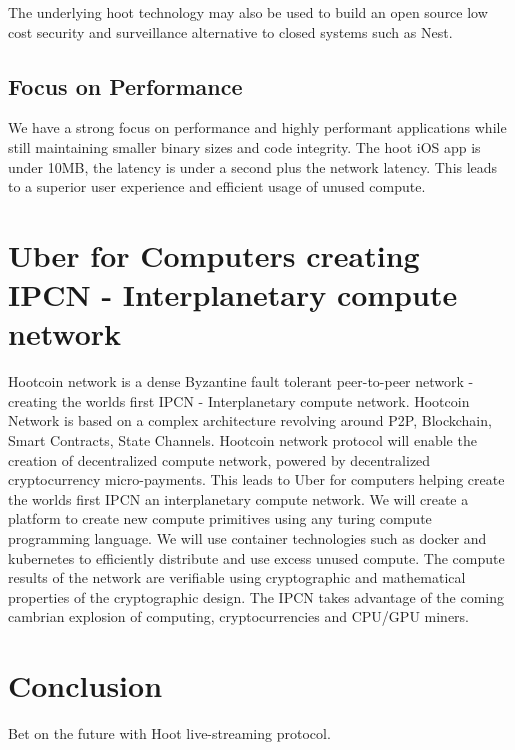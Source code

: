 \documentclass{article}
\begin{document}
The underlying hoot technology may also be used to build an open
source low cost security and surveillance alternative to closed systems
such as Nest.

\subsection{Focus on Performance}
We have a strong focus on performance and highly performant applications while still maintaining smaller binary sizes and  code integrity. The hoot iOS app is under 10MB, the latency is under a second plus the network latency. This leads to a superior user experience and efficient usage of unused compute.

\section{Uber for Computers creating IPCN - Interplanetary compute network}
Hootcoin network is a dense Byzantine fault tolerant peer-to-peer network - creating the worlds first IPCN - Interplanetary compute network.
Hootcoin Network is based on a complex architecture revolving around P2P, Blockchain, Smart Contracts, State Channels. Hootcoin network protocol will enable the creation of decentralized compute network, powered by decentralized cryptocurrency micro-payments. This leads to Uber for computers helping create the worlds first IPCN an interplanetary compute network. We will create a platform to create new compute primitives using any turing compute programming language. We will use container technologies such as  docker and kubernetes to efficiently distribute and use excess unused compute. The compute results of the network are verifiable using cryptographic and mathematical properties of the cryptographic design. The IPCN takes advantage of the coming cambrian explosion of computing, cryptocurrencies and CPU/GPU miners.


\section{Conclusion}
Bet on the future with Hoot live-streaming protocol.




\newpage
\listoffigures
\newpage 
\listoftables
\newpage 

\end{document}
